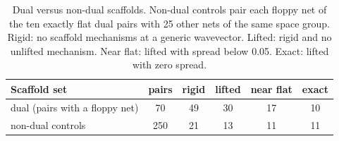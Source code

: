 \begin{table}[h]\centering
\caption{Dual versus non-dual scaffolds. Non-dual controls pair each floppy net of the ten exactly flat dual pairs with 25 other nets of the same space group. Rigid: no scaffold mechanisms at a generic wavevector. Lifted: rigid and no unlifted mechanism. Near flat: lifted with spread below 0.05. Exact: lifted with zero spread.}\label{tab:nondual}
\begin{tabular}{lccccc}
\hline
Scaffold set & pairs & rigid & lifted & near flat & exact \\
\hline
dual (pairs with a floppy net) & 70 & 49 & 30 & 17 & 10 \\
non-dual controls & 250 & 21 & 13 & 11 & 11 \\
\hline
\end{tabular}
\end{table}